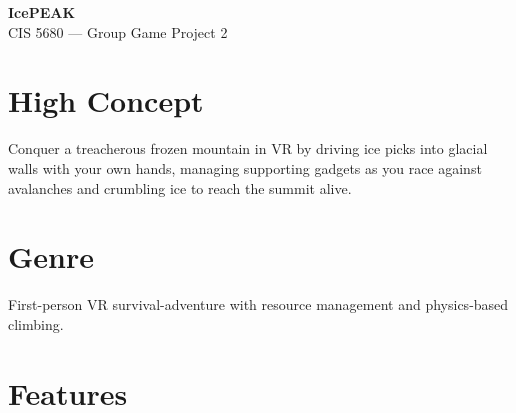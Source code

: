 \documentclass[12pt]{article}
\begin{document}
\begin{center}
    {\LARGE \textbf{IcePEAK}}\\[0.3em]
    {\large CIS 5680 --- Group Game Project 2}
\end{center}

\section{High Concept}

Conquer a treacherous frozen mountain in VR by driving ice picks into glacial walls with your own hands, managing supporting gadgets as you race against avalanches and crumbling ice to reach the summit alive.

\section{Genre}

First-person VR survival-adventure with resource management and physics-based climbing.

\section{Features}
\end{document}
